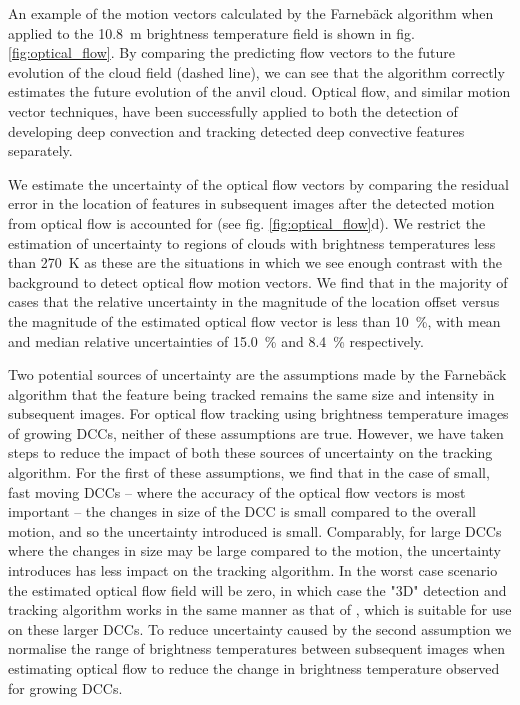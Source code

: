 An example of the motion vectors calculated by the Farnebäck algorithm when applied to the 10.8~\textmu m brightness temperature field is shown in fig. \ref{fig:optical_flow}.
By comparing the predicting flow vectors to the future evolution of the cloud field (dashed line), we can see that the algorithm correctly estimates the future evolution of the anvil cloud.
Optical flow, and similar motion vector techniques, have been successfully applied to both the detection of developing deep convection \citep{zinner_cb-tram:_2008, zhang_locating_2014} and tracking detected deep convective features \citep{senf_size-resolved_2018} separately.

We estimate the uncertainty of the optical flow vectors by comparing the residual error in the location of features in subsequent images after the detected motion from optical flow is accounted for (see fig. \ref{fig:optical_flow}d).
We restrict the estimation of uncertainty to regions of clouds with brightness temperatures less than 270~K as these are the situations in which we see enough contrast with the background to detect optical flow motion vectors.
We find that in the majority of cases that the relative uncertainty in the magnitude of the location offset versus the magnitude of the estimated optical flow vector is less than 10~\%, with mean and median relative uncertainties of 15.0~\% and 8.4~\% respectively.

Two potential sources of uncertainty are the assumptions made by the Farnebäck algorithm that the feature being tracked remains the same size and intensity in subsequent images.
For optical flow tracking using brightness temperature images of growing DCCs, neither of these assumptions are true.
However, we have taken steps to reduce the impact of both these sources of uncertainty on the tracking algorithm.
For the first of these assumptions, we find that in the case of small, fast moving DCCs -- where the accuracy of the optical flow vectors is most important -- the changes in size of the DCC is small compared to the overall motion, and so the uncertainty introduced is small.
Comparably, for large DCCs where the changes in size may be large compared to the motion, the uncertainty introduces has less impact on the tracking algorithm.
In the worst case scenario the estimated optical flow field will be zero, in which case the "3D" detection and tracking algorithm works in the same manner as that of \citet{fiolleau_algorithm_2013}, which is suitable for use on these larger DCCs.
To reduce uncertainty caused by the second assumption we normalise the range of brightness temperatures between subsequent images when estimating optical flow to reduce the change in brightness temperature observed for growing DCCs.


